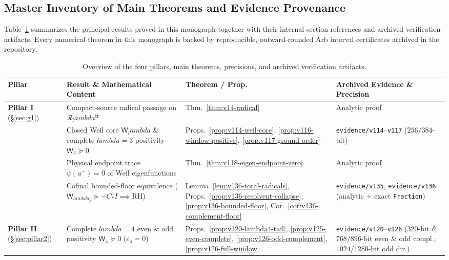 \documentclass[11pt]{article}
\def\lambda{lambda}%
\theoremstyle{remark}
\begin{document}
\subsection{Master Inventory of Main Theorems and Evidence Provenance}
Table~\ref{tab:master-inventory} summarizes the principal results proved in this monograph together with their internal section references and archived verification artifacts. Every numerical theorem in this monograph is backed by reproducible, outward-rounded Arb interval certificates archived in the repository.

\begin{table}[htbp]
\centering
\caption{Overview of the four pillars, main theorems, precisions, and archived verification artifacts.}
\label{tab:master-inventory}
\footnotesize
\begin{tabular}{>{\raggedright\arraybackslash}p{2.0cm}>{\raggedright\arraybackslash}p{5.2cm}>{\raggedright\arraybackslash}p{3.4cm}>{\raggedright\arraybackslash}p{3.9cm}}
\toprule
\textbf{Pillar} & \textbf{Result \& Mathematical Content} & \textbf{Theorem / Prop.} & \textbf{Archived Evidence \& Precision} \\
\midrule
\textbf{Pillar I} (\S\ref{sec:g1}) & Compact-source radical passage on $\mathcal R_\lambda^{\mathrm{tr}}$ & Thm.~\ref{thm:v14-radical} & Analytic proof \\
 & Closed Weil core $\mathsf W_\lambda$ \& complete $\lambda=3$ positivity $\mathsf W_3\succeq 0$ & Props.~\ref{prop:v114-weil-core}, \ref{prop:v116-window-positive}, \ref{prop:v117-ground-order} & \texttt{evidence/v114}--\texttt{v117} ($256/384$-bit) \\
 & Physical endpoint trace $\widetilde\psi(a^-)=0$ of Weil eigenfunctions & Thm.~\ref{thm:v118-eigen-endpoint-zero} & Analytic proof \\
 & Cofinal bounded-floor equivalence ($\mathsf W_{\lambda_j}\succeq -C_*I \implies \mathrm{RH}$) & Lemma~\ref{lem:v136-total-radicals}, Props.~\ref{prop:v136-resolvent-collapse}, \ref{prop:v136-bounded-floor}, Cor.~\ref{cor:v136-complement-floor} & \texttt{evidence/v135}, \texttt{evidence/v136} (analytic + exact \texttt{Fraction}) \\
\midrule
\textbf{Pillar II} (\S\ref{sec:pillar2}) & Complete $\lambda=4$ even \& odd positivity $\mathsf W_4\succeq 0$ ($\varepsilon_4=0$) & Props.~\ref{prop:v120-lambda4-tail}, \ref{prop:v125-even-complete}, \ref{prop:v126-odd-complement}, \ref{prop:v126-full-window} & \texttt{evidence/v120}--\texttt{v126} ($320$-bit $\delta$; $768/896$-bit even \& odd compl.; $1024/1280$-bit odd dir.) \\

\end{tabular}
\end{table}
\end{document}

